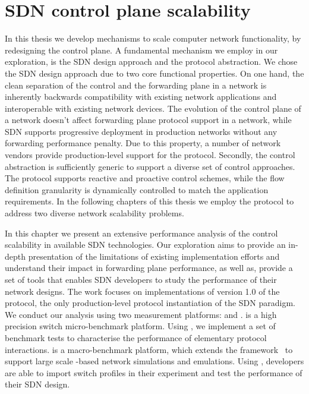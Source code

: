 \chapter{SDN control plane scalability} \label{sec:sdn_scalability} 
\ifpdf
    \graphicspath{{Chapter1/Chapter1Figs/PNG/}{Chapter1/Chapter1Figs/PDF/}{Chapter1/Chapter1Figs/}}
\else
    \graphicspath{{Chapter1/Chapter1Figs/EPS/}{Chapter1/Chapter1Figs/}}
\fi

In this thesis we develop mechanisms to scale computer network functionality, by
redesigning the control plane.  A fundamental mechanism we employ in our
exploration, is the SDN design approach and the \of protocol abstraction.  We
chose the SDN design approach due to two core functional properties.  On one
hand, the clean separation of the control and the forwarding plane in a network
is inherently backwards compatibility with existing network applications and
interoperable with existing network devices.  The evolution of the control plane
of a network doesn't affect forwarding plane protocol support in a network,
while SDN supports progressive deployment in production networks without any
forwarding performance penalty. Due to this property, a number of network
vendors provide production-level support for the \of protocol.  Secondly, the
\of control abstraction is sufficiently generic to support a diverse set of
control approaches. The protocol supports reactive and proactive control
schemes, while the flow definition granularity is dynamically controlled to
match the application requirements. In the following chapters of this thesis we
employ the \of protocol to address two diverse network scalability problems. 

In this chapter we present an extensive performance analysis of the control
scalability in available SDN technologies. Our exploration aims to provide an 
in-depth presentation of the limitations of existing implementation efforts and
understand their impact in forwarding plane performance, as well as, provide a
set of tools that enables SDN developers to study the performance of their
network designs. The work focuses on implementations of version 1.0 of the \of
protocol, the only production-level protocol instantiation of the SDN paradigm.
We conduct our analysis using two measurement platforms: \oflops and \sdnsim.
\oflops is a high precision \of switch micro-benchmark platform. Using \oflops,
we implement a set of benchmark tests to characterise the performance of elementary
\of protocol interactions. \sdnsim is a macro-benchmark \of platform, which
extends the \Unik framework~\cite{madhavapeddy2013} to support large scale
\of-based network simulations and emulations.  Using \sdnsim, developers are
able to import \oflops switch profiles in their experiment and test the
performance of their SDN design.


